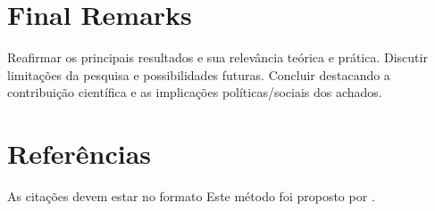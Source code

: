 \documentclass[
  authoryear,
  preprint,
  3p,
  onecolumn]{elsarticle}
\begin{document}
\section{Final Remarks}\label{final-remarks}

Reafirmar os principais resultados e sua relevância teórica e prática.
Discutir limitações da pesquisa e possibilidades futuras. Concluir
destacando a contribuição científica e as implicações políticas/sociais
dos achados.

\section{Referências}\label{referuxeancias}

As citações devem estar no formato Este método foi proposto por
\citet{hadash2018estimate}.



\end{document}
